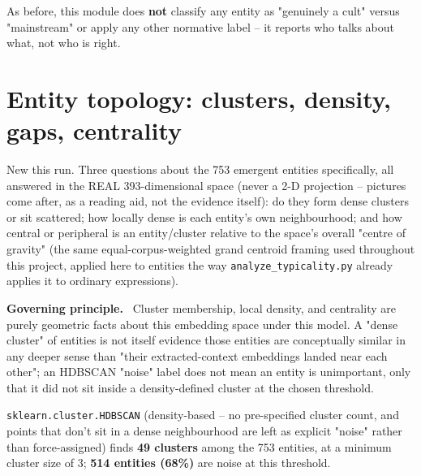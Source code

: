 \documentclass[11pt,a4paper]{article}
\newenvironment{plainbox}[1][Note]
  {\par\vspace{6pt}\noindent{\color{noteline}\rule{\linewidth}{0.6pt}}\par\vspace{3pt}
   \noindent\small\textbf{#1.}\ \ignorespaces}
  {\par\vspace{3pt}\noindent{\color{noteline}\rule{\linewidth}{0.6pt}}\vspace{6pt}\par}
\begin{document}
As before, this module does \textbf{not} classify any entity as
"genuinely a cult" versus "mainstream" or apply any other normative
label -- it reports who talks about what, not who is right.

\section{Entity topology: clusters, density, gaps, centrality}
\label{sec:topology}

New this run. Three questions about the 753 emergent entities
specifically, all answered in the REAL 393-dimensional space (never a
2-D projection -- pictures come after, as a reading aid, not the
evidence itself): do they form dense clusters or sit scattered; how
locally dense is each entity's own neighbourhood; and how central or
peripheral is an entity/cluster relative to the space's overall "centre
of gravity" (the same equal-corpus-weighted grand centroid framing used
throughout this project, applied here to entities the way
\texttt{analyze\_typicality.py} already applies it to ordinary
expressions).

\begin{plainbox}[Governing principle]
Cluster membership, local density, and centrality are purely geometric
facts about this embedding space under this model. A "dense cluster" of
entities is not itself evidence those entities are conceptually similar
in any deeper sense than "their extracted-context embeddings landed near
each other"; an HDBSCAN "noise" label does not mean an entity is
unimportant, only that it did not sit inside a density-defined cluster
at the chosen threshold.
\end{plainbox}

\texttt{sklearn.cluster.HDBSCAN} (density-based -- no pre-specified
cluster count, and points that don't sit in a dense neighbourhood are
left as explicit "noise" rather than force-assigned) finds
\textbf{49 clusters} among the 753 entities, at a minimum cluster size of
3; \textbf{514 entities (68\%)} are noise at this threshold.
\end{document}
